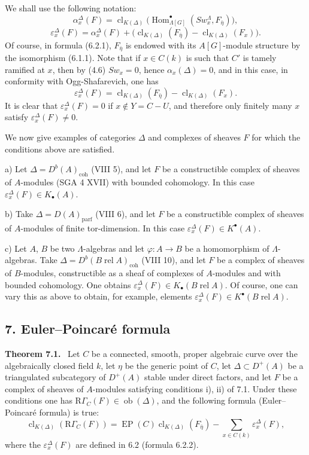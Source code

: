 \documentclass[11pt]{article}
\newenvironment{statement}[1]{\par\medskip\noindent\textbf{#1.}\ }{\par\medskip}
\DeclareMathOperator{\Hom}{Hom}
\providecommand{\EP}{\operatorname{EP}}
\providecommand{\parf}{\mathrm{parf}}
\providecommand{\coh}{\mathrm{coh}}
\providecommand{\Ob}{\operatorname{ob}}
\providecommand{\Hom}{\operatorname{Hom}}
\providecommand{\Ob}{\operatorname{ob}}
\providecommand{\EP}{\operatorname{EP}}
\providecommand{\Ob}{\operatorname{Ob}}
\providecommand{\parf}{\mathrm{parf}}
\providecommand{\coh}{\mathrm{coh}}
\providecommand{\clK}[1]{\operatorname{cl}_{K(#1)}}
\providecommand{\RG}{\mathrm R\Gamma}
\providecommand{\Hom}{\operatorname{Hom}}
\providecommand{\Ob}{\operatorname{ob}}
\providecommand{\Ob}{\operatorname{Ob}}
\begin{document}
We shall use the following notation:
\[
\alpha_x^\Delta(F)
=
\clK{\Delta}\bigl(\Hom^\bullet_{\Lambda[G]}(Sw_x^\Lambda,F_{\bar\eta})\bigr),
\tag{6.2.1}
\]
\[
\varepsilon_x^\Delta(F)
=
\alpha_x^\Delta(F)+
\bigl(\clK{\Delta}(F_{\bar\eta})-\clK{\Delta}(F_x)\bigr).
\tag{6.2.2}
\]
Of course, in formula (6.2.1), $F_{\bar\eta}$ is endowed with its $A[G]$-module structure by the isomorphism (6.1.1). Note that if $x\in C(k)$ is such that $C'$ is tamely ramified at $x$, then by (4.6) $Sw_x=0$, hence $\alpha_x(\Delta)=0$, and in this case, in conformity with Ogg-Shafarevich, one has
\[
\varepsilon_x^\Delta(F)=\clK{\Delta}(F_{\bar\eta})-\clK{\Delta}(F_x).
\tag{6.2.3}
\]
It is clear that $\varepsilon_x^\Delta(F)=0$ if $x\notin Y=C-U$, and therefore only finitely many $x$ satisfy $\varepsilon_x^\Delta(F)\ne0$.

We now give examples of categories $\Delta$ and complexes of sheaves $F$ for which the conditions above are satisfied.

a) Let $\Delta=D^b(A)_{\coh}$ (VIII 5), and let $F$ be a constructible complex of sheaves of $A$-modules (SGA 4 XVII) with bounded cohomology. In this case $\varepsilon_x^\Delta(F)\in K_\bullet(A)$.

b) Take $\Delta=D(A)_{\parf}$ (VIII 6), and let $F$ be a constructible complex of sheaves of $A$-modules of finite tor-dimension. In this case $\varepsilon_x^\Delta(F)\in K^{\bullet}(A)$.

c) Let $A$, $B$ be two $\Lambda$-algebras and let $\varphi:A\to B$ be a homomorphism of $\Lambda$-algebras. Take $\Delta=D^b(B\operatorname{ rel }A)_{\coh}$ (VIII 10), and let $F$ be a complex of sheaves of $B$-modules, constructible as a sheaf of complexes of $A$-modules and with bounded cohomology. One obtains $\varepsilon_x^\Delta(F)\in K_\bullet(B\operatorname{ rel }A)$. Of course, one can vary this as above to obtain, for example, elements $\varepsilon_x^\Delta(F)\in K^{\bullet}(B\operatorname{ rel }A)$.

\subsection*{7. Euler--Poincaré formula}

\begin{statement}{Theorem 7.1}
Let $C$ be a connected, smooth, proper algebraic curve over the algebraically closed field $k$, let $\eta$ be the generic point of $C$, let $\Delta\subset D^+(A)$ be a triangulated subcategory of $D^+(A)$ stable under direct factors, and let $F$ be a complex of sheaves of $A$-modules satisfying conditions i), ii) of 7.1. Under these conditions one has $\RG_C(F)\in\Ob(\Delta)$, and the following formula (Euler--Poincaré formula) is true:
\[
\clK{\Delta}(\RG_C(F))
=
\EP(C)\clK{\Delta}(F_{\bar\eta})
-\sum_{x\in C(k)}\varepsilon_x^\Delta(F),
\tag{7.2}
\]
where the $\varepsilon_x^\Delta(F)$ are defined in 6.2 (formula 6.2.2).
\end{statement}
\end{document}
